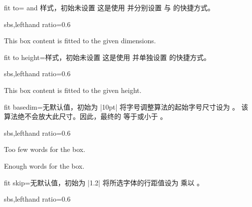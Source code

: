 \clearpage
\begin{docTcbKey}{fit to}{= and }{样式，初始未设置}
  这是使用  并分别设置  与  的快捷方式。
\begin{dispExample*}{sbs,lefthand ratio=0.6}

\begin{tcolorbox}[fit to=3cm and 2cm]
  This box content is fitted to the given
  dimensions.
\end{tcolorbox}
\end{dispExample*}
\end{docTcbKey}


\begin{docTcbKey}{fit to height}{=}{样式，初始未设置}
  这是使用  并单独设置  的快捷方式。
\begin{dispExample*}{sbs,lefthand ratio=0.6}

\begin{tcolorbox}[fit to height=2cm]
  This box content is fitted to the given
  height.
\end{tcolorbox}
\end{dispExample*}
\end{docTcbKey}

\begin{docTcbKey}{fit basedim}{=}{无默认值，初始为 |10pt|}
  将字号调整算法的起始字号尺寸设为 。
  该算法绝不会放大此尺寸。因此，最终的 
  等于或小于 。

\begin{dispExample*}{sbs,lefthand ratio=0.6}

\begin{tcolorbox}[fit to=4cm and 2cm]
  Too few words for the box.
\end{tcolorbox}

\begin{tcolorbox}[fit to=4cm and 2cm,
  fit basedim=50pt]
  Enough words for the box.
\end{tcolorbox}
\end{dispExample*}
\end{docTcbKey}


\begin{docTcbKey}{fit skip}{=}{无默认值，初始为 |1.2|}
  将所选字体的行距值设为  乘以 。

\begin{dispExample*}{sbs,lefthand ratio=0.6}

\begin{tcolorbox}[fit to=5cm and 4cm,
  fit skip=1.0  ]
  \lipsum[1]
\end{tcolorbox}
\end{dispExample*}
\end{docTcbKey}



